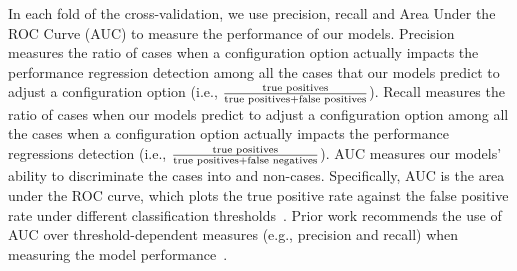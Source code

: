 In each fold of the cross-validation, we use precision, recall and 
Area Under the ROC Curve (AUC) to measure the performance of our models.
Precision measures the ratio of cases when a configuration option actually impacts the performance regression detection among all the cases that our models predict to adjust a configuration option (i.e., $\frac{\textnormal{true positives}}{\textnormal{true positives} + \textnormal{false positives}}$). Recall measures the ratio of cases when our models predict to adjust a configuration option among all the cases when a configuration option actually impacts the performance regressions detection (i.e., $\frac{\textnormal{true positives}}{\textnormal{true positives} + \textnormal{false negatives}}$). 
AUC measures our models' ability to discriminate the \instance cases into \inconsistent and non-\inconsistent cases. Specifically, AUC is the area under the ROC curve, which plots the true positive rate against the false positive rate under different classification thresholds~\cite{lobo2008auc}. 
Prior work recommends the use of AUC over threshold-dependent measures (e.g., precision and recall) when measuring the model performance~\cite{tantithamthavorn18experience}.

